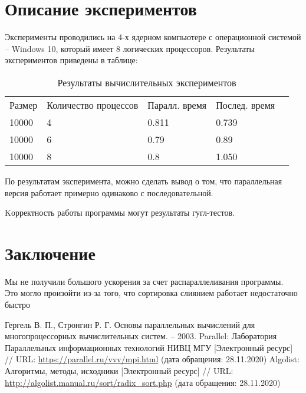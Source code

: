\documentclass{report}
\begin{document}
\section*{Описание экспериментов}
Эксперименты проводились на 4-х ядерном компьютере с операционной системой – Windows 10, который имеет 8 логических процессоров. Результаты экспериментов приведены в таблице:
\begin{table}[!h]
\caption{Результаты вычислительных экспериментов}
\centering
\begin{tabular}{lllll}
Размер & Количество процессов & Паралл. время & Послед. время\\
10000 & 4 & 0.811 & 0.739 \\
10000 & 6 & 0.79 & 0.89 \\
10000 & 8 & 0.8 & 1.050 \\

\end{tabular}
\end{table}
\par
По результатам эксперимента, можно сделать вывод о том, что параллельная версия работает примерно одинаково с последовательной. 
\par
Kорректность работы программы могут результаты гугл-тестов.
\newpage

\section*{Заключение}
Мы не получили большого ускорения за счет распараллеливания программы.\\
Это могло произойти из-за того, что сортировка слиянием работает
недостаточно быстро

\newpage

\begin{thebibliography}{1}
Гергель В. П., Стронгин Р. Г. Основы параллельных вычислений для многопроцессорных вычислительных систем. – 2003.
 Parallel: Лаборатория Параллельных информационных технологий НИВЦ МГУ [Электронный ресурс] // URL: \url {https://parallel.ru/vvv/mpi.html} (дата обращения: 28.11.2020)
 Algolist: Алгоритмы, методы, исходники [Электронный ресурс] // URL: \url {http://algolist.manual.ru/sort/radix_sort.php} (дата обращения: 28.11.2020)
\end{thebibliography}
\newpage
\end{document}
